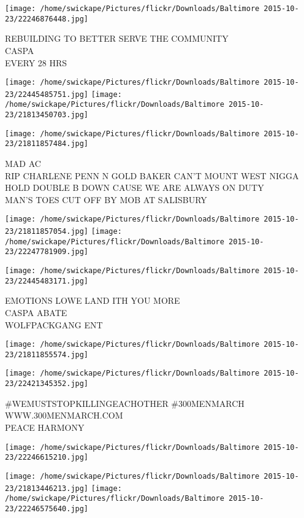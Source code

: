 \documentclass[10pt,letterpaper]{article}
\begin{document}
\vspace{0.25in}
\texttt{[image: /home/swickape/Pictures/flickr/Downloads/Baltimore 2015-10-23/22246876448.jpg]}

REBUILDING TO BETTER SERVE THE COMMUNITY\\
CASPA\\
EVERY 28 HRS
\pagebreak

\texttt{[image: /home/swickape/Pictures/flickr/Downloads/Baltimore 2015-10-23/22445485751.jpg]}
\texttt{[image: /home/swickape/Pictures/flickr/Downloads/Baltimore 2015-10-23/21813450703.jpg]}

\vspace{0.25in}
\texttt{[image: /home/swickape/Pictures/flickr/Downloads/Baltimore 2015-10-23/21811857484.jpg]}

MAD AC\\
RIP CHARLENE PENN N GOLD BAKER CAN'T MOUNT WEST NIGGA HOLD DOUBLE B DOWN CAUSE WE ARE ALWAYS ON DUTY\\
MAN'S TOES CUT OFF BY MOB AT SALISBURY
\pagebreak

\texttt{[image: /home/swickape/Pictures/flickr/Downloads/Baltimore 2015-10-23/21811857054.jpg]}
\texttt{[image: /home/swickape/Pictures/flickr/Downloads/Baltimore 2015-10-23/22247781909.jpg]}

\texttt{[image: /home/swickape/Pictures/flickr/Downloads/Baltimore 2015-10-23/22445483171.jpg]}

EMOTIONS LOWE LAND ITH YOU MORE\\
CASPA ABATE\\
WOLFPACKGANG ENT
\pagebreak

\texttt{[image: /home/swickape/Pictures/flickr/Downloads/Baltimore 2015-10-23/21811855574.jpg]}

\vspace{0.25in}
\texttt{[image: /home/swickape/Pictures/flickr/Downloads/Baltimore 2015-10-23/22421345352.jpg]}

\#WEMUSTSTOPKILLINGEACHOTHER \#300MENMARCH WWW.300MENMARCH.COM\\
PEACE HARMONY
\pagebreak

\texttt{[image: /home/swickape/Pictures/flickr/Downloads/Baltimore 2015-10-23/22246615210.jpg]}

\vspace{0.25in}
\texttt{[image: /home/swickape/Pictures/flickr/Downloads/Baltimore 2015-10-23/21813446213.jpg]}
\texttt{[image: /home/swickape/Pictures/flickr/Downloads/Baltimore 2015-10-23/22246575640.jpg]}
\end{document}
